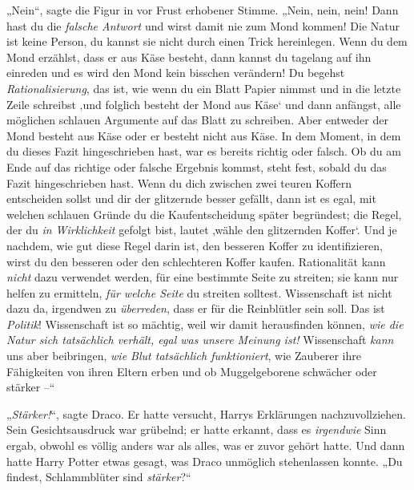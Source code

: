 „Nein“, sagte die Figur in vor Frust erhobener Stimme. „Nein, nein, nein! Dann hast du die \emph{falsche Antwort} und wirst damit nie zum Mond kommen! Die Natur ist keine Person, du kannst sie nicht durch einen Trick hereinlegen. Wenn du dem Mond erzählst, dass er aus Käse besteht, dann kannst du tagelang auf ihn einreden und es wird den Mond kein bisschen verändern! Du begehst \emph{Rationalisierung}, das ist, wie wenn du ein Blatt Papier nimmst und in die letzte Zeile schreibst ‚und folglich besteht der Mond aus Käse‘ und dann anfängst, alle möglichen schlauen Argumente auf das Blatt zu schreiben. Aber entweder der Mond besteht aus Käse oder er besteht nicht aus Käse. In dem Moment, in dem du dieses Fazit hingeschrieben hast, war es bereits richtig oder falsch. Ob du am Ende auf das richtige oder falsche Ergebnis kommst, steht fest, sobald du das Fazit hingeschrieben hast. Wenn du dich zwischen zwei teuren Koffern entscheiden sollst und dir der glitzernde besser gefällt, dann ist es egal, mit welchen schlauen Gründe du die Kaufentscheidung später begründest; die Regel, der du \emph{in Wirklichkeit} gefolgt bist, lautet ‚wähle den glitzernden Koffer‘. Und je nachdem, wie gut diese Regel darin ist, den besseren Koffer zu identifizieren, wirst du den besseren oder den schlechteren Koffer kaufen. Rationalität kann \emph{nicht} dazu verwendet werden, für eine bestimmte Seite zu streiten; sie kann nur helfen zu ermitteln, \emph{für welche Seite} du streiten solltest. Wissenschaft ist nicht dazu da, irgendwen zu \emph{überreden}, dass er für die Reinblütler sein soll. Das ist \emph{Politik}! Wissenschaft ist so mächtig, weil wir damit herausfinden können, \emph{wie die Natur sich tatsächlich verhält, egal was unsere Meinung ist!} Wissenschaft \emph{kann} uns aber beibringen, \emph{wie Blut tatsächlich funktioniert}, wie Zauberer ihre Fähigkeiten von ihren Eltern erben und ob Muggelgeborene schwächer oder stärker –“

„\emph{Stärker!}“, sagte Draco. Er hatte versucht, Harrys Erklärungen nachzuvollziehen. Sein Gesichtsausdruck war grübelnd; er hatte erkannt, dass es \emph{irgendwie} Sinn ergab, obwohl es völlig anders war als alles, was er zuvor gehört hatte. Und dann hatte Harry Potter etwas gesagt, was Draco unmöglich stehenlassen konnte. „Du findest, Schlammblüter sind \emph{stärker}?“


